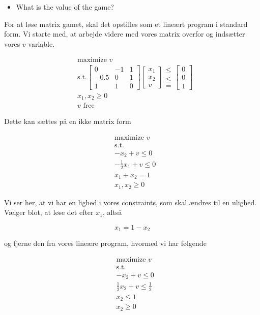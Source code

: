 \documentclass[paper=a4, fontsize=11pt]{scrartcl} %
\numberwithin{equation}{section} %
\numberwithin{figure}{section} %
\numberwithin{table}{section} %
\begin{document}
	\begin{itemize}
		\item What is the value of the game?
	\end{itemize}
	
	For at løse matrix gamet, skal det opstilles som et lineært program i standard form. Vi starte med, at arbejde videre med vores matrix overfor og indsætter vores $v$ variable.
	
	\begin{align*}
	&\text{maximize } v\\
	&\text{s.t.} \begin{bmatrix}
	0 & -1  & 1\\
	-0.5 &0 & 1 \\
	1 & 1 & 0
	\end{bmatrix} \begin{bmatrix}
	x_1 \\ x_2 \\ v
	\end{bmatrix} \begin{matrix}
	\leq \\ \leq \\ = 
	\end{matrix} \begin{bmatrix}
	0 \\ 0 \\ 1
	\end{bmatrix}\\
	&x_1,x_2 \geq 0\\
	&v \text{ free}
	\end{align*}
	
    Dette kan sættes på en ikke matrix form 
	
	\begin{align*}
	&\text{maximize } v\\
	&\text{s.t.} \\
	& -x_2 + v \leq 0 \\
	& -\frac{1}{2}x_1 + v \leq 0\\
	& x_1 + x_2 = 1 \\
	&x_1,x_2 \geq 0
	\end{align*}
	
	
	Vi ser her, at vi har en lighed i vores constraints, som skal ændres til en ulighed. Vælger blot, at løse det efter $x_1$, altså 
	
	\[x_1 = 1 - x_2\]
	
	og fjerne den fra vores lineære program, hvormed vi har følgende
	
	\begin{align*}
	&\text{maximize } v \\
	&\text{s.t.} \\
	& -x_2 + v \leq 0\\
	& \frac{1}{2}x_2 + v \leq \frac{1}{2}\\
	&x_2 \leq 1\\
	&x_2 \geq 0
	\end{align*}
	
\end{document}
